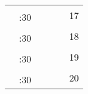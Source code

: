 \documentclass[10pt, a5paper, final, oneside]{memoir}
\newcommand{\grayline}{\arrayrulecolor{lightgray}\cline{1-5}\arrayrulecolor{black}}
\begin{document}
\begin{tabularx}{\linewidth}{|c|c|X|X|X|c}
    & & & && \multirow{2}{*}{17}\\ 
    \grayline
    & :30 & & &&\\ \hline

    & & & && \multirow{2}{*}{18}\\ 
    \grayline
    & :30 & & &&\\ \hline

    & & & && \multirow{2}{*}{19}\\ 
    \grayline
    & :30 & & &&\\ \hline
    
    & & & && \multirow{2}{*}{20}\\ 
    \grayline
    & :30 & & &&\\ \hline

\end{tabularx}

\newpage
\end{document}
